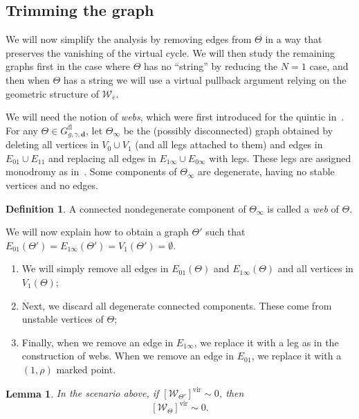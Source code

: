 \documentclass{amsart}
\newtheorem{lem}[thm]{Lemma}
\theoremstyle{definition}
\newtheorem{defn}[thm]{Definition}
\theoremstyle{remark}
\theoremstyle{plain}
\theoremstyle{definition}
\theoremstyle{remark}
\newcommand{\mc}[1]{\mathcal{#1}}
\newcommand{\mbf}[1]{\mathbf{#1}}
\newcommand{\mr}[1]{\mathrm{#1}}
\newcommand{\1}{\mathbf{1}}
\newcommand{\2}{\mathbf{2}}
\newcommand{\3}{\mathbf{3}}
\newcommand{\vir}{\mr{vir}}
\begin{document}
\subsection{Trimming the graph}%
\label{sub:Trimming edges}

We will now simplify the analysis by removing edges from $\Theta$ in a way that preserves the vanishing of the virtual cycle. We will then study the remaining graphs first in the case where $\Theta$ has no ``string'' by reducing the $N=1$ case, and then when $\Theta$ has a string we will use a virtual pullback argument relying on the geometric structure of $\mc{W}_{\bar{e}}$.

We will need the notion of \textit{webs}, which were first introduced for the quintic in~\cite[\S 5.2]{nmsp}. For any $\Theta \in G_{g,\gamma,\mbf{d}}^{\mr{fl}}$, let $\Theta_{\infty}$ be the (possibly disconnected) graph obtained by deleting all vertices in $V_0 \cup V_1$ (and all legs attached to them) and edges in $E_{01} \cup E_{11}$ and replacing all edges in $E_{1\infty} \cup E_{0\infty}$ with legs. These legs are assigned monodromy as in~. Some components of $\Theta_{\infty}$ are degenerate, having no stable vertices and no edges.

\begin{defn}
    A connected nondegenerate component of $\Theta_{\infty}$ is called a \textit{web} of $\Theta$.
\end{defn}

We will now explain how to obtain a graph $\Theta'$ such that $E_{01}(\Theta') = E_{1\infty}(\Theta') = V_1(\Theta') = \emptyset$.
\begin{enumerate}
    \item We will simply remove all edges in $E_{01}(\Theta)$ and $E_{1\infty}(\Theta)$ and all vertices in $V_1(\Theta)$;
    \item Next, we discard all degenerate connected components. These come from unstable vertices of $\Theta$;
    \item Finally, when we remove an edge in $E_{1\infty}$, we replace it with a leg as in the construction of webs. When we remove an edge in $E_{01}$, we replace it with a $(1,\rho)$ marked point.
\end{enumerate}

\begin{lem}
    In the scenario above, if $[\mc{W}_{\Theta'}]^{\vir} \sim 0$, then
    \[ [\mc{W}_{\Theta}]^{\vir} \sim 0. \]
\end{lem}
\end{document}
